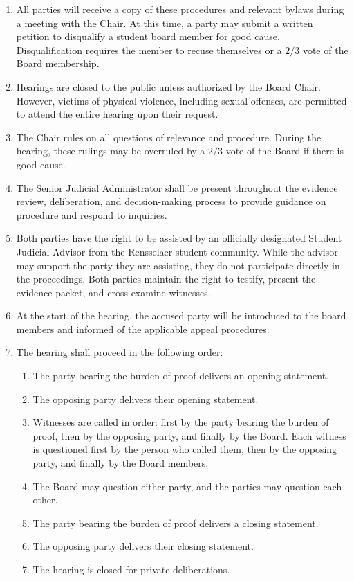 \begin{enumerate}
    \item All parties will receive a copy of these procedures and relevant bylaws during a meeting with the Chair. At this time, a party may submit a written petition to disqualify a student board member for good cause. Disqualification requires the member to recuse themselves or a $2/3$ vote of the Board membership.
    
    \item Hearings are closed to the public unless authorized by the Board Chair. However, victims of physical violence, including sexual offenses, are permitted to attend the entire hearing upon their request.
    
    \item The Chair rules on all questions of relevance and procedure. During the hearing, these rulings may be overruled by a $2/3$ vote of the Board if there is good cause.
    
    \item The Senior Judicial Administrator shall be present throughout the evidence review, deliberation, and decision-making process to provide guidance on procedure and respond to inquiries.
    
    \item Both parties have the right to be assisted by an officially designated Student Judicial Advisor from the Rensselaer student community. While the advisor may support the party they are assisting, they do not participate directly in the proceedings. Both parties maintain the right to testify, present the evidence packet, and cross-examine witnesses.
    
    \item At the start of the hearing, the accused party will be introduced to the board members and informed of the applicable appeal procedures.
    
    \item The hearing shall proceed in the following order:
    \begin{enumerate}
        \item The party bearing the burden of proof delivers an opening statement.
        \item The opposing party delivers their opening statement.
        \item Witnesses are called in order: first by the party bearing the burden of proof, then by the opposing party, and finally by the Board. Each witness is questioned first by the person who called them, then by the opposing party, and finally by the Board members.
        \item The Board may question either party, and the parties may question each other.
        \item The party bearing the burden of proof delivers a closing statement.
        \item The opposing party delivers their closing statement.
        \item The hearing is closed for private deliberations.
    \end{enumerate}
    

\end{enumerate}
